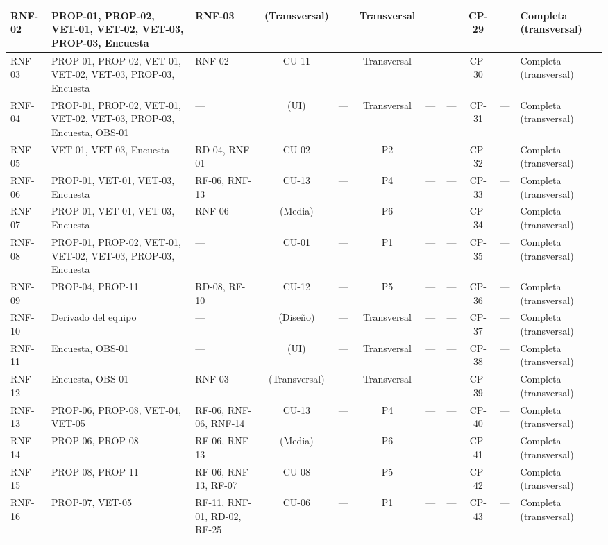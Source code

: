 \documentclass[journal,onecolumn]{IEEEtran}
\begin{document}
\begin{landscape}
\begin{table}[H]
\begin{tabularx}{\linewidth}{|l|X|X|c|X|c|c|c|c|c|X|}
		RNF-02 & PROP-01, PROP-02, VET-01, VET-02, VET-03, PROP-03, Encuesta & RNF-03 & (Transversal) & --- & Transversal & --- & --- & CP-29 & --- & Completa (transversal) \\ \hline
		RNF-03 & PROP-01, PROP-02, VET-01, VET-02, VET-03, PROP-03, Encuesta & RNF-02 & CU-11 & --- & Transversal & --- & --- & CP-30 & --- & Completa (transversal) \\ \hline
		RNF-04 & PROP-01, PROP-02, VET-01, VET-02, VET-03, PROP-03, Encuesta, OBS-01 & --- & (UI) & --- & Transversal & --- & --- & CP-31 & --- & Completa (transversal) \\ \hline
		RNF-05 & VET-01, VET-03, Encuesta & RD-04, RNF-01 & CU-02 & --- & P2 & --- & --- & CP-32 & --- & Completa (transversal) \\ \hline
		RNF-06 & PROP-01, VET-01, VET-03, Encuesta & RF-06, RNF-13 & CU-13 & --- & P4 & --- & --- & CP-33 & --- & Completa (transversal) \\ \hline
		RNF-07 & PROP-01, VET-01, VET-03, Encuesta & RNF-06 & (Media) & --- & P6 & --- & --- & CP-34 & --- & Completa (transversal) \\ \hline
		RNF-08 & PROP-01, PROP-02, VET-01, VET-02, VET-03, PROP-03, Encuesta & --- & CU-01 & --- & P1 & --- & --- & CP-35 & --- & Completa (transversal) \\ \hline
		RNF-09 & PROP-04, PROP-11 & RD-08, RF-10 & CU-12 & --- & P5 & --- & --- & CP-36 & --- & Completa (transversal) \\ \hline
		RNF-10 & Derivado del equipo & --- & (Diseño) & --- & Transversal & --- & --- & CP-37 & --- & Completa (transversal) \\ \hline
		RNF-11 & Encuesta, OBS-01 & --- & (UI) & --- & Transversal & --- & --- & CP-38 & --- & Completa (transversal) \\ \hline
		RNF-12 & Encuesta, OBS-01 & RNF-03 & (Transversal) & --- & Transversal & --- & --- & CP-39 & --- & Completa (transversal) \\ \hline
		RNF-13 & PROP-06, PROP-08, VET-04, VET-05 & RF-06, RNF-06, RNF-14 & CU-13 & --- & P4 & --- & --- & CP-40 & --- & Completa (transversal) \\ \hline
		RNF-14 & PROP-06, PROP-08 & RF-06, RNF-13 & (Media) & --- & P6 & --- & --- & CP-41 & --- & Completa (transversal) \\ \hline
		RNF-15 & PROP-08, PROP-11 & RF-06, RNF-13, RF-07 & CU-08 & --- & P5 & --- & --- & CP-42 & --- & Completa (transversal) \\ \hline
		RNF-16 & PROP-07, VET-05 & RF-11, RNF-01, RD-02, RF-25 & CU-06 & --- & P1 & --- & --- & CP-43 & --- & Completa (transversal) \\ \hline
	\end{tabularx}
\end{table}
\end{landscape}
\end{document}
